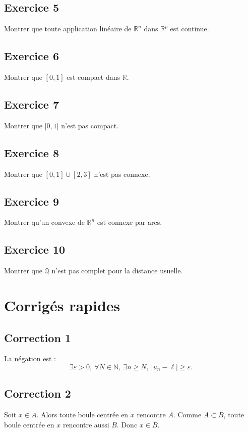 \documentclass[11pt,a4paper]{article}
\theoremstyle{definition}
\theoremstyle{plain}
\newcommand{\R}{\mathbb{R}}
\newcommand{\N}{\mathbb{N}}
\newcommand{\Q}{\mathbb{Q}}
\newcommand{\eps}{\varepsilon}
\begin{document}
\subsection*{Exercice 5}
Montrer que toute application linéaire de $\R^n$ dans $\R^p$ est continue.

\subsection*{Exercice 6}
Montrer que $[0,1]$ est compact dans $\R$.

\subsection*{Exercice 7}
Montrer que $]0,1[$ n'est pas compact.

\subsection*{Exercice 8}
Montrer que $[0,1]\cup[2,3]$ n'est pas connexe.

\subsection*{Exercice 9}
Montrer qu'un convexe de $\R^n$ est connexe par arcs.

\subsection*{Exercice 10}
Montrer que $\Q$ n'est pas complet pour la distance usuelle.

\section{Corrigés rapides}

\subsection*{Correction 1}
La négation est :
\[
\exists \eps>0,\ \forall N\in\N,\ \exists n\geq N,\ |u_n-\ell|\geq \eps.
\]

\subsection*{Correction 2}
Soit $x\in\overline A$.
Alors toute boule centrée en $x$ rencontre $A$.
Comme $A\subset B$, toute boule centrée en $x$ rencontre aussi $B$.
Donc $x\in\overline B$.
\end{document}
